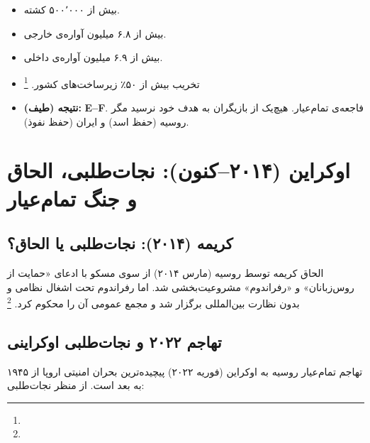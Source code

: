 \begin{tcolorbox}[enemybox, title={آمار فاجعه‌ی سوریه (تا ۲۰۲۳)}]
\begin{itemize}[nosep, rightmargin=1em]
  \item بیش از ۵۰۰٬۰۰۰ کشته.
  \item بیش از ۶.۸ میلیون آواره‌ی خارجی.
  \item بیش از ۶.۹ میلیون آواره‌ی داخلی.
  \item تخریب بیش از ۵۰٪ زیرساخت‌های کشور.%
  \footnote{}
  \item \textbf{نتیجه (طیف):} \textbf{E–F}. فاجعه‌ی تمام‌عیار. هیچ‌یک از بازیگران به هدف خود نرسید مگر روسیه (حفظ اسد) و ایران (حفظ نفوذ).
\end{itemize}
\end{tcolorbox}

\section{اوکراین (۲۰۱۴–کنون): نجات‌طلبی، الحاق و جنگ تمام‌عیار}
\label{sec:ch10-ukraine}

\subsection{کریمه (۲۰۱۴): نجات‌طلبی یا الحاق؟}

الحاق کریمه توسط روسیه (مارس ۲۰۱۴) از سوی مسکو با ادعای «حمایت از روس‌زبانان» و «رفراندوم» مشروعیت‌بخشی شد. اما رفراندوم تحت اشغال نظامی و بدون نظارت بین‌المللی برگزار شد و مجمع عمومی آن را محکوم کرد.%
\footnote{}

\subsection{تهاجم ۲۰۲۲ و نجات‌طلبی اوکراینی}

تهاجم تمام‌عیار روسیه به اوکراین (فوریه ۲۰۲۲) پیچیده‌ترین بحران امنیتی اروپا از ۱۹۴۵ به بعد است. از منظر نجات‌طلبی:

